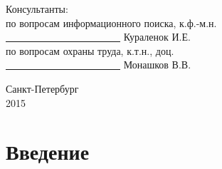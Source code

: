 \documentclass[12pt,a4paper]{report}
\renewcommand{\contentsname}{Содержание}
\begin{document}
\begin{titlepage}
\begin{center}
\vspace*{0.3cm}

\begin{flushleft}
Консультанты:\\
\vspace*{0.3cm}
по вопросам информационного поиска, к.ф.-м.н. \ \ \ \ \ \ \underline{ \ \ \ \ \ \ \ \ \ \ \ \ \ \ \ \ \ \ \ \ \ \ \ } Кураленок И.Е.\\
\vspace*{0.3cm}
по вопросам охраны труда, к.т.н., доц. \ \ \ \ \ \ \ \ \ \ \ \ \ \ \ \ \ \ \ \ \underline{ \ \ \ \ \ \ \ \ \ \ \ \ \ \ \ \ \ \ \ \ \ \ \ } Монашков В.В.
\end{flushleft}

\end{center}
\vfill
\begin{center}
{\large Санкт-Петербург \\ 2015}
\end {center}
\end{titlepage}

\hoffset 0.46cm
\marginparsep 0pt
\oddsidemargin 0pt
\textwidth 16.5cm
\topmargin -1.5cm
\textheight 9.5in
\footskip 40pt
\parindent 1cm

\makeatletter
{}
\apptocmd{\@makechapterhead}{}{}{}
\makeatother

\setcounter{tocdepth}{4}
\normalsize

\renewcommand{\contentsname}{Содержание}
\tableofcontents

\chapter*{Введение}


\end{document}
